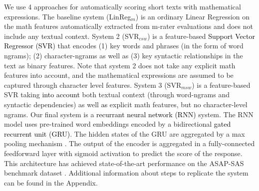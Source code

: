 \documentclass[11pt,a4paper]{article}
\newcommand{\AC}{\textcolor{black}} %
\begin{document}
We use 4 approaches for automatically scoring short texts with mathematical expressions. The baseline system (LinReg$_{m}$) is an ordinary Linear Regression on the math features automatically extracted from m-rater evaluations and does not include any textual context. System 2 (SVR$_{csw}$) is a feature-based \AC{Support Vector Regressor (SVR)} that encodes (1) key words and phrases (in the form of word ngrams); (2) character-ngrams as well as (3) key syntactic relationships in the text as binary features. Note that system 2 does not take any explicit math features into account, and the mathematical expressions are assumed to be captured through character level features. System 3 (SVR$_{msw}$) is a feature-based SVR taking \AC{into account} both textual context (through word-ngrams and syntactic dependencies) as well \AC{as} explicit math features, but no character-level ngrams. Our final system is a \AC{recurrant neural network (RNN)} system. The RNN model uses pre-trained word embeddings encoded by a bidirectional \AC{gated recurrent unit (GRU)}. The hidden states of the GRU are aggregated by a max pooling mechanism \cite{shen-etal-2018-baseline}. The output of the encoder is aggregated in a fully-connected feedforward layer with sigmoid activation to predict the score of the response. This architecture has achieved state-of-the-art performance on the ASAP-SAS benchmark dataset \cite{riordan_how_2019}. Additional information about steps to replicate the system can be found in the Appendix. 
\end{document}
